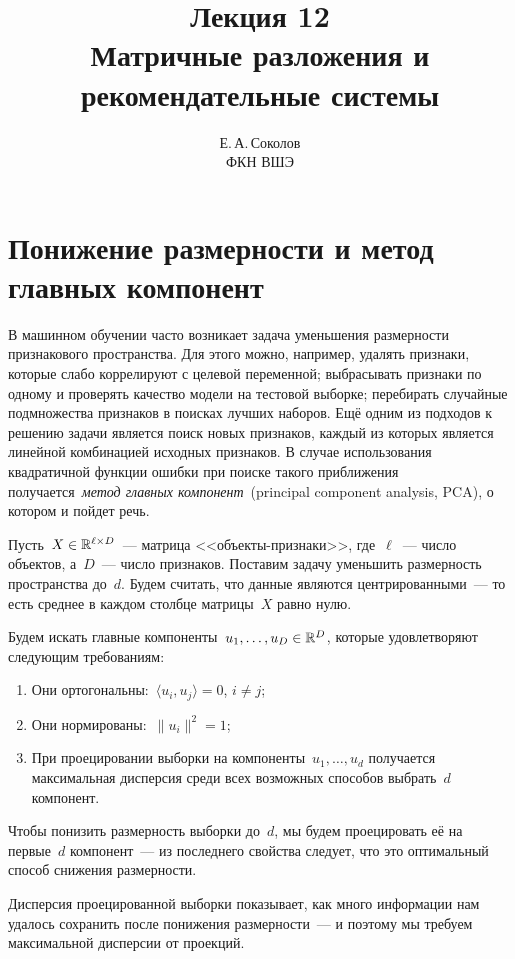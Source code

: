 \documentclass[12pt,fleqn]{article}
\begin{document}
	\title{Лекция 12\\Матричные разложения и рекомендательные системы}
	\author{Е.\,А.\,Соколов\\ФКН ВШЭ}
	\maketitle
	
	\section{Понижение размерности и метод главных компонент}
	
	В машинном обучении часто возникает задача уменьшения размерности
	признакового пространства.
	Для этого можно, например, удалять признаки, которые слабо коррелируют с целевой переменной;
	выбрасывать признаки по одному и проверять качество модели на тестовой выборке;
	перебирать случайные подмножества признаков в поисках лучших наборов.
	Ещё одним из подходов к решению задачи является поиск новых признаков,
	каждый из которых является линейной комбинацией исходных признаков.
	В случае использования квадратичной функции ошибки при поиске
	такого приближения получается~\emph{метод главных компонент}~(principal
	component analysis, PCA),
	о котором и пойдет речь.
	
	Пусть~$X \in \RR^{\ell \times D}$~--- матрица <<объекты-признаки>>,
	где~$\ell$~--- число объектов, а~$D$~--- число признаков.
	Поставим задачу уменьшить размерность пространства до~$d$.
	Будем считать, что данные являются центрированными~--- то есть среднее
	в каждом столбце матрицы~$X$ равно нулю.
	
	Будем искать главные компоненты~$u_1, \dots, u_D \in \mathbb{R}^D$, которые удовлетворяют
	следующим требованиям:
	\begin{enumerate}
		\item Они ортогональны:~$\langle u_i, u_j \rangle = 0$, $i \neq j$;
		\item Они нормированы:~$\|u_i\|^2 = 1$;
		\item При проецировании выборки на компоненты~$u_1, \dots, u_d$ получается
		максимальная дисперсия среди всех возможных способов выбрать~$d$ компонент.
	\end{enumerate}
	

	Чтобы понизить размерность выборки до~$d$, мы будем проецировать её на первые~$d$ компонент~---
	из последнего свойства следует, что это оптимальный способ снижения размерности.
	
	Дисперсия проецированной выборки показывает, как много информации нам удалось сохранить после
	понижения размерности~--- и поэтому мы требуем максимальной дисперсии от проекций.
	
\end{document}
